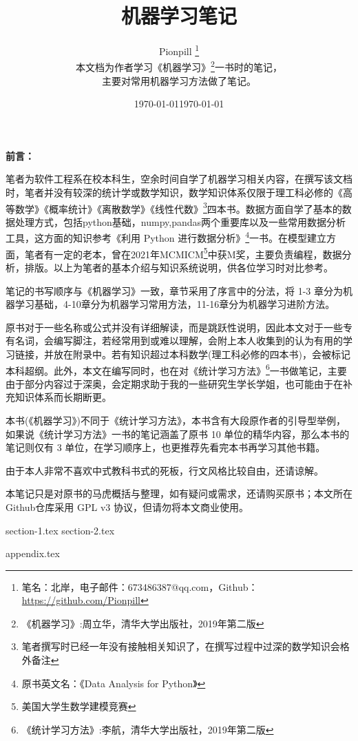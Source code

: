 \documentclass{PionpillNote-book}
\title{机器学习笔记}
\author{
    Pionpill \footnote{笔名：北岸，电子邮件：673486387@qq.com，Github：\url{https://github.com/Pionpill}} \\
    本文档为作者学习《机器学习》\footnote{《机器学习》:周立华，清华大学出版社，2019年第二版}一书时的笔记，\\
    主要对常用机器学习方法做了笔记。\\
}
\date{\today}
\begin{document}
\maketitle

\noindent\textbf{前言：}

笔者为软件工程系在校本科生，空余时间自学了机器学习相关内容，在撰写该文档时，笔者并没有较深的统计学或数学知识，数学知识体系仅限于理工科必修的《高等数学》《概率统计》《离散数学》《线性代数》\footnote{笔者撰写时已经一年没有接触相关知识了，在撰写过程中过深的数学知识会格外备注}四本书。数据方面自学了基本的数据处理方式，包括python基础，numpy,pandas两个重要库以及一些常用数据分析工具，这方面的知识参考《利用 Python 进行数据分析》\footnote{原书英文名：《Data Analysis for Python》}一书。在模型建立方面，笔者有一定的老本，曾在2021年MCMICM\footnote{美国大学生数学建模竞赛}中获M奖，主要负责编程，数据分析，排版。以上为笔者的基本介绍与知识系统说明，供各位学习时对比参考。

笔记的书写顺序与《机器学习》一致，章节采用了序言中的分法，将 1-3 章分为机器学习基础，4-10章分为机器学习常用方法，11-16章分为机器学习进阶方法。

原书对于一些名称或公式并没有详细解读，而是跳跃性说明，因此本文对于一些专有名词，会编写脚注，若经常用到或难以理解，会附上本人收集到的认为有用的学习链接，并放在附录中。若有知识超过本科数学(理工科必修的四本书)，会被标记本科超纲。此外，本文在编写同时，也在对《统计学习方法》\footnote{《统计学习方法》:李航，清华大学出版社，2019年第二版}一书做笔记，主要由于部分内容过于深奥，会定期求助于我的一些研究生学长学姐，也可能由于在补充知识体系而长期断更。

本书(《机器学习》)不同于《统计学习方法》，本书含有大段原作者的引导型举例，如果说《统计学习方法》一书的笔记涵盖了原书 10 单位的精华内容，那么本书的笔记则仅有 3 单位，在学习顺序上，也更推荐先看完本书再学习其他书籍。

由于本人非常不喜欢中式教科书式的死板，行文风格比较自由，还请谅解。

本笔记只是对原书的马虎概括与整理，如有疑问或需求，还请购买原书；本文所在Github仓库采用 GPL v3 协议，但请勿将本文商业使用。

\date{\today}

\tableofcontents
\thispagestyle{empty}
\newpage
\setcounter{page}{1} 

{section-1.tex}
{section-2.tex}

{appendix.tex}
\end{document}
